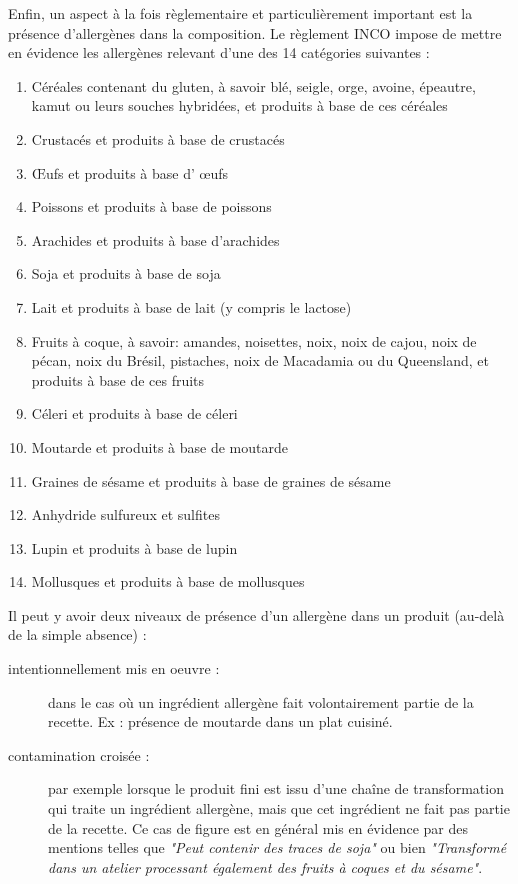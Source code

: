                 Enfin, un aspect à la fois règlementaire et particulièrement important est la présence d'allergènes dans la composition.
                Le règlement INCO\cite{incotext}\cite{incoexpl} impose de mettre en évidence les allergènes relevant d'une des 14 catégories suivantes :
                \begin{enumerate}
                    \item Céréales contenant du gluten, à savoir blé, seigle, orge, avoine, épeautre, kamut ou leurs souches hybridées, et produits à base de ces céréales
                    \item Crustacés et produits à base de crustacés
                    \item \OE ufs et produits à base d’ \oe ufs
                    \item Poissons et produits à base de poissons
                    \item Arachides et produits à base d'arachides
                    \item Soja et produits à base de soja
                    \item Lait et produits à base de lait (y compris le lactose)
                    \item Fruits à coque, à savoir: amandes, noisettes, noix, noix de cajou, noix de pécan, noix du Brésil, pistaches, noix de Macadamia ou du Queensland, et produits à base de ces fruits
                    \item Céleri et produits à base de céleri
                    \item Moutarde et produits à base de moutarde
                    \item Graines de sésame et produits à base de graines de sésame
                    \item Anhydride sulfureux et sulfites
                    \item Lupin et produits à base de lupin
                    \item Mollusques et produits à base de mollusques
                \end{enumerate}
                Il peut y avoir deux niveaux de présence d'un allergène dans un produit (au-delà de la simple absence) :
                \begin{description}
                    \item[intentionnellement mis en oeuvre :] dans le cas où un ingrédient allergène fait volontairement partie de la recette. Ex : présence de moutarde dans un plat cuisiné.
                    \item[contamination croisée :] par exemple lorsque le produit fini est issu d'une chaîne de transformation qui traite un ingrédient allergène, mais que cet ingrédient ne fait pas partie de la recette. Ce cas de figure est en général mis en évidence par des mentions telles que \emph{"Peut contenir des traces de soja"} ou bien \emph{"Transformé dans un atelier processant également des fruits à coques et du sésame"}.
                \end{description}

